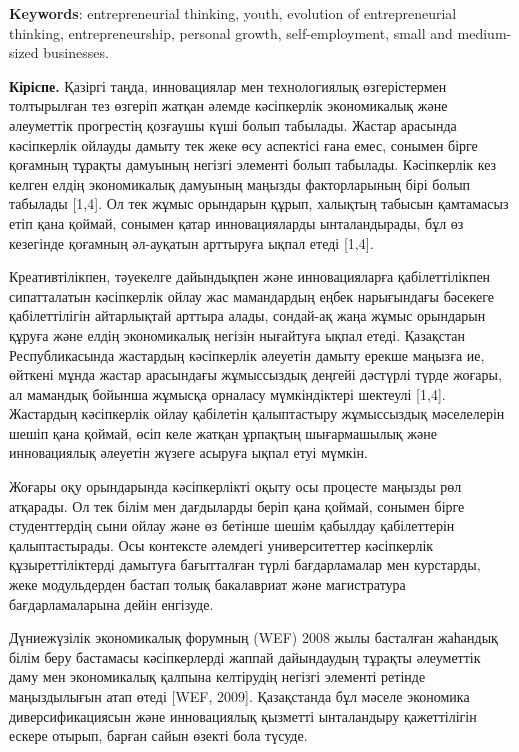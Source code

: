 {\bfseries Keywords}: entrepreneurial thinking, youth, evolution of
entrepreneurial thinking, entrepreneurship, personal growth,
self-employment, small and medium-sized businesses.
\begin{multicols}{2}

{\bfseries Кіріспе.} Қазіргі таңда, инновациялар мен технологиялық
өзгерістермен толтырылған тез өзгеріп жатқан әлемде кәсіпкерлік
экономикалық және әлеуметтік прогрестің қозғаушы күші болып табылады.
Жастар арасында кәсіпкерлік ойлауды дамыту тек жеке өсу аспектісі ғана
емес, сонымен бірге қоғамның тұрақты дамуының негізгі элементі болып
табылады. Кәсіпкерлік кез келген елдің экономикалық дамуының маңызды
факторларының бірі болып табылады {[}1,4{]}. Ол тек жұмыс орындарын
құрып, халықтың табысын қамтамасыз етіп қана қоймай, сонымен қатар
инновацияларды ынталандырады, бұл өз кезегінде қоғамның әл-ауқатын
арттыруға ықпал етеді {[}1,4{]}.

Креативтілікпен, тәуекелге дайындықпен және инновацияларға
қабілеттілікпен сипатталатын кәсіпкерлік ойлау жас мамандардың еңбек
нарығындағы бәсекеге қабілеттілігін айтарлықтай арттыра алады, сондай-ақ
жаңа жұмыс орындарын құруға және елдің экономикалық негізін нығайтуға
ықпал етеді. Қазақстан Республикасында жастардың кәсіпкерлік әлеуетін
дамыту ерекше маңызға ие, өйткені мұнда жастар арасындағы жұмыссыздық
деңгейі дәстүрлі түрде жоғары, ал мамандық бойынша жұмысқа орналасу
мүмкіндіктері шектеулі {[}1,4{]}. Жастардың кәсіпкерлік ойлау қабілетін
қалыптастыру жұмыссыздық мәселелерін шешіп қана қоймай, өсіп келе жатқан
ұрпақтың шығармашылық және инновациялық әлеуетін жүзеге асыруға ықпал
етуі мүмкін.

Жоғары оқу орындарында кәсіпкерлікті оқыту осы процесте маңызды рөл
атқарады. Ол тек білім мен дағдыларды беріп қана қоймай, сонымен бірге
студенттердің сыни ойлау және өз бетінше шешім қабылдау қабілеттерін
қалыптастырады. Осы контексте әлемдегі университеттер кәсіпкерлік
құзыреттіліктерді дамытуға бағытталған түрлі бағдарламалар мен
курстарды, жеке модульдерден бастап толық бакалавриат және магистратура
бағдарламаларына дейін енгізуде.

Дүниежүзілік экономикалық форумның (WEF) 2008 жылы басталған жаһандық
білім беру бастамасы кәсіпкерлерді жаппай дайындаудың тұрақты әлеуметтік
даму мен экономикалық қалпына келтірудің негізгі элементі ретінде
маңыздылығын атап өтеді {[}WEF, 2009{]}. Қазақстанда бұл мәселе
экономика диверсификациясын және инновациялық қызметті ынталандыру
қажеттілігін ескере отырып, барған сайын өзекті бола түсуде.


\end{multicols}
